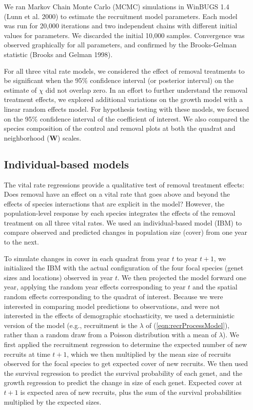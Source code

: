 \documentclass[11pt]{article}
\begin{document}
\begin{doublespacing}
We ran Markov Chain Monte Carlo (MCMC) simulations in WinBUGS 1.4 (Lunn et al. 2000) to estimate the recruitment model parameters. Each model was run for 20,000 iterations and two independent chains with different initial values for parameters. We discarded the initial 10,000 samples. Convergence was observed graphically for all parameters, and confirmed by the Brooks-Gelman statistic (Brooks and Gelman 1998).

For all three vital rate models, we considered the effect of removal treatments to be significant when the 95\% confidence interval (or posterior
interval) on the estimate of $\chi$ did not overlap zero. In an effort to further understand the removal treatment effects, we explored additional variations on the growth model with a linear random effects model. For hypothesis testing with these models, we focused on the 95\% confidence interval of the coefficient of interest. We also compared the species composition of the control and removal plots at both the quadrat and neighborhood ($\boldsymbol{W}$) scales.

\subsection*{Individual-based models}

The vital rate regressions provide a qualitative test of removal treatment effects: Does removal have an effect on a vital rate that goes above and beyond the effects of species interactions that are explicit in the model? However, the population-level response by each species integrates the effects of the removal treatment on all three vital rates. We used an individual-based model (IBM) to compare observed and predicted changes 
in population size (cover) from one year to the next. 

To simulate changes in cover in each quadrat from year $t$ to year $t+1$, we initialized the IBM with the actual configuration of the four focal species (genet sizes and locations) observed in year $t$. We then projected the model forward one year, applying the random year effects corresponding to year $t$ and the spatial random effects corresponding to the quadrat of interest. Because we were interested in comparing model predictions to observations, and were not interested in the effects of demographic stochasticity, we used a deterministic version of the model (e.g., recruitment is the $\lambda$ of (\ref{eqn:recrProcessModel}), rather than a random draw from a Poisson distribution with a mean of $\lambda$).
We first applied the recruitment regression to determine the expected number of new recruits at time $t+1$, which we then multiplied by the mean size of recruits observed for the focal species to get expected cover of new recruits. We then used the survival regression to predict the survival probability of each genet, and the growth regression to predict the change in size of each genet. Expected cover at $t+1$ is expected area of new recruits, plus the sum of the survival probabilities multiplied by the expected sizes. 


\end{doublespacing}
\end{document}
